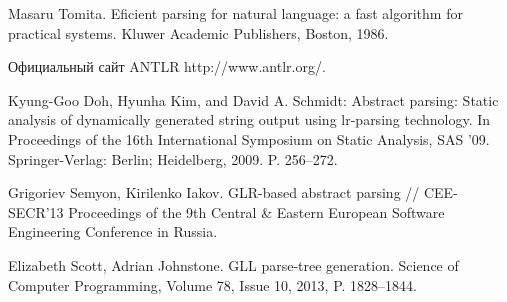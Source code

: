 \begin{thebibliography}{99}
Masaru Tomita. Eficient parsing for natural language: a fast algorithm for practical systems. Kluwer Academic Publishers, Boston, 1986.

Официальный сайт ANTLR http://www.antlr.org/.

Kyung-Goo Doh, Hyunha Kim, and David A. Schmidt: Abstract parsing: Static analysis of dynamically generated string output using lr-parsing technology. In Proceedings of the 16th International Symposium on Static Analysis, SAS ’09. Springer-Verlag: Berlin; Heidelberg, 2009. P. 256–272.

Grigoriev Semyon, Kirilenko Iakov. GLR-based abstract parsing // CEE-SECR’13 Proceedings of the 9th Central & Eastern European Software Engineering Conference in Russia.

Elizabeth Scott, Adrian Johnstone. GLL parse-tree generation. Science of Computer Programming, Volume 78, Issue 10, 2013, P. 1828–1844.
\end{thebibliography}
